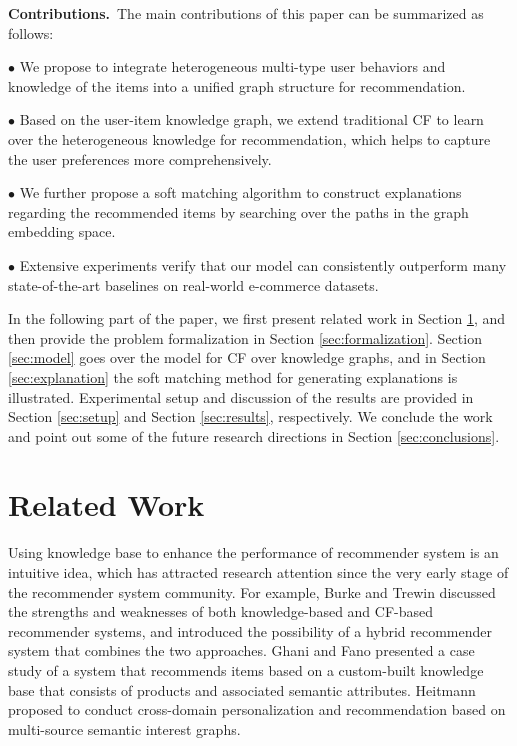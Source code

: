 \documentclass[algorithms,article,accept,moreauthors,pdftex,10pt,a4paper]{Definitions/mdpi}
\begin{document}
\noindent
\textbf{Contributions.}~The main contributions of this paper can be summarized as follows:

\vspace{6pt} $\bullet$ We propose to integrate heterogeneous multi-type user behaviors and knowledge of the items into a unified graph structure for recommendation.

$\bullet$ Based on the user-item knowledge graph, we extend traditional CF to learn over the heterogeneous knowledge for recommendation, which helps to capture the user preferences more comprehensively.

$\bullet$ We further propose a soft matching algorithm to construct explanations regarding the recommended items by searching over the paths in the graph embedding space.

$\bullet$ Extensive experiments verify that our model can consistently outperform many state-of-the-art baselines on real-world e-commerce datasets.

\vspace{6pt} In the following part of the paper, we first present related work in Section \ref{sec:related}, and then provide the problem formalization in Section \ref{sec:formalization}. Section \ref{sec:model} goes over the model for CF over knowledge graphs, and in Section \ref{sec:explanation} the soft matching method for generating explanations is illustrated. Experimental setup and discussion of the results are provided in Section \ref{sec:setup} and Section \ref{sec:results}, respectively. We conclude the work and point out some of the future research directions in Section \ref{sec:conclusions}.






\section{Related Work}\label{sec:related}

Using knowledge base to enhance the performance of recommender system is an intuitive idea, which has attracted research attention since the very early stage of the recommender system community. For example, Burke \cite{burke1999integrating} and Trewin \cite{burke2000knowledge} discussed the strengths and weaknesses of both knowledge-based and CF-based recommender systems, and introduced the possibility of a hybrid recommender system that combines the two approaches. Ghani and Fano \cite{ghani2002building} presented a case study of a system that recommends items based on a custom-built knowledge base that consists of products and associated semantic attributes. 
Heitmann \cite{heitmann2012open} proposed to conduct cross-domain personalization and recommendation based on multi-source semantic interest graphs.
\end{document}
